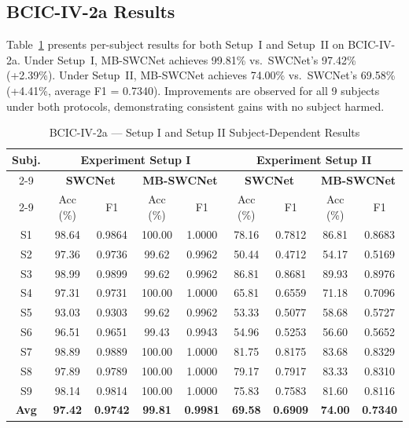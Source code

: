 \documentclass[conference]{IEEEtran}
\begin{document}
\subsection{BCIC-IV-2a Results}

Table~\ref{tab:bcic_combined} presents per-subject results for both Setup~I and Setup~II on BCIC-IV-2a. Under Setup~I, MB-SWCNet achieves 99.81\% vs.\ SWCNet's 97.42\% (+2.39\%). Under Setup~II, MB-SWCNet achieves 74.00\% vs.\ SWCNet's 69.58\% (+4.41\%, average F1 = 0.7340). Improvements are observed for all 9 subjects under both protocols, demonstrating consistent gains with no subject harmed.

\begin{table}[t]
\caption{BCIC-IV-2a --- Setup I and Setup II Subject-Dependent Results}
\begin{center}
\setlength{\tabcolsep}{3.5pt}
\begin{tabular}{|c|cc|cc||cc|cc|}
\hline
\multirow{3}{*}{\textbf{Subj.}} &
\multicolumn{4}{c||}{\textbf{Experiment Setup I}} &
\multicolumn{4}{c|}{\textbf{Experiment Setup II}} \\
\cline{2-9}
& \multicolumn{2}{c|}{\textbf{SWCNet \cite{b1}}} & \multicolumn{2}{c||}{\textbf{MB-SWCNet}} &
  \multicolumn{2}{c|}{\textbf{SWCNet \cite{b1}}} & \multicolumn{2}{c|}{\textbf{MB-SWCNet}} \\
\cline{2-9}
& Acc (\%) & F1 & Acc (\%) & F1 & Acc (\%) & F1 & Acc (\%) & F1 \\
\hline
S1 & 98.64 & 0.9864 & 100.00 & 1.0000 & 78.16 & 0.7812 & 86.81 & 0.8683 \\
S2 & 97.36 & 0.9736 & 99.62  & 0.9962 & 50.44 & 0.4712 & 54.17 & 0.5169 \\
S3 & 98.99 & 0.9899 & 99.62  & 0.9962 & 86.81 & 0.8681 & 89.93 & 0.8976 \\
S4 & 97.31 & 0.9731 & 100.00 & 1.0000 & 65.81 & 0.6559 & 71.18 & 0.7096 \\
S5 & 93.03 & 0.9303 & 99.62  & 0.9962 & 53.33 & 0.5077 & 58.68 & 0.5727 \\
S6 & 96.51 & 0.9651 & 99.43  & 0.9943 & 54.96 & 0.5253 & 56.60 & 0.5652 \\
S7 & 98.89 & 0.9889 & 100.00 & 1.0000 & 81.75 & 0.8175 & 83.68 & 0.8329 \\
S8 & 97.89 & 0.9789 & 100.00 & 1.0000 & 79.17 & 0.7917 & 83.33 & 0.8310 \\
S9 & 98.14 & 0.9814 & 100.00 & 1.0000 & 75.83 & 0.7583 & 81.60 & 0.8116 \\
\hline
\textbf{Avg} & \textbf{97.42} & \textbf{0.9742} & \textbf{99.81} & \textbf{0.9981} & \textbf{69.58} & \textbf{0.6909} & \textbf{74.00} & \textbf{0.7340} \\
\hline
\end{tabular}
\label{tab:bcic_combined}
\end{center}
\end{table}
\end{document}
